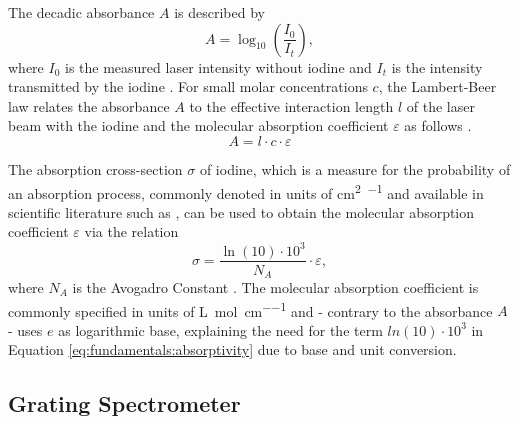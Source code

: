 The decadic absorbance $A$ is described by
\begin{equation}
    \label{eq:fundamentals:absorbance}
    A = \log_{10}\left(\frac{I_0}{I_t}\right) ,
\end{equation}
where $I_0$ is the measured laser intensity without iodine and $I_t$ is the intensity transmitted by the iodine \cite{demtroder2014laser}. For small molar concentrations $c$, the Lambert-Beer law relates the absorbance $A$ to the effective interaction length $l$ of the laser beam with the iodine and the molecular absorption coefficient $\varepsilon$ as follows \cite{attenuation}.
\begin{equation}
    \label{eq:fundamentals:beer}
    A = l \cdot c \cdot \varepsilon
\end{equation}

The absorption cross-section $\sigma$ of iodine, which is a measure for the probability of an absorption process, commonly denoted in units of \si{\cm\squared\per\molecule} and available in scientific literature such as \cite{Iodine}, can be used to obtain the molecular absorption coefficient $\varepsilon$ via the relation
\begin{equation}
    \label{eq:fundamentals:absorptivity}
    \sigma = \frac{\ln(10) \cdot 10^3}{N_A} \cdot \varepsilon ,
\end{equation}
where $N_A$ is the Avogadro Constant \cite{attenuation}. The molecular absorption coefficient is commonly specified in units of \si{\liter\per\mol\per\cm} and - contrary to the absorbance $A$ - uses $e$ as logarithmic base, explaining the need for the term $ln(10) \cdot 10^3$ in Equation \ref{eq:fundamentals:absorptivity} due to base and unit conversion.


\subsection{Grating Spectrometer}

